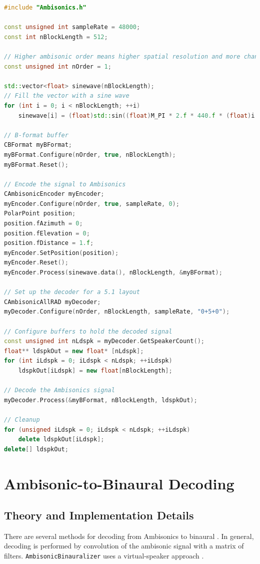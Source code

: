 \documentclass[12pt]{report}
\begin{document}
\begin{lstlisting}[language=C++]
#include "Ambisonics.h"

const unsigned int sampleRate = 48000;
const int nBlockLength = 512;

// Higher ambisonic order means higher spatial resolution and more channels required
const unsigned int nOrder = 1;

std::vector<float> sinewave(nBlockLength);
// Fill the vector with a sine wave
for (int i = 0; i < nBlockLength; ++i)
    sinewave[i] = (float)std::sin((float)M_PI * 2.f * 440.f * (float)i / (float)sampleRate);

// B-format buffer
CBFormat myBFormat;
myBFormat.Configure(nOrder, true, nBlockLength);
myBFormat.Reset();

// Encode the signal to Ambisonics
CAmbisonicEncoder myEncoder;
myEncoder.Configure(nOrder, true, sampleRate, 0);
PolarPoint position;
position.fAzimuth = 0;
position.fElevation = 0;
position.fDistance = 1.f;
myEncoder.SetPosition(position);
myEncoder.Reset();
myEncoder.Process(sinewave.data(), nBlockLength, &myBFormat);

// Set up the decoder for a 5.1 layout
CAmbisonicAllRAD myDecoder;
myDecoder.Configure(nOrder, nBlockLength, sampleRate, "0+5+0");

// Configure buffers to hold the decoded signal
const unsigned int nLdspk = myDecoder.GetSpeakerCount();
float** ldspkOut = new float* [nLdspk];
for (int iLdspk = 0; iLdspk < nLdspk; ++iLdspk)
    ldspkOut[iLdspk] = new float[nBlockLength];

// Decode the Ambisonics signal
myDecoder.Process(&myBFormat, nBlockLength, ldspkOut);

// Cleanup
for (unsigned iLdspk = 0; iLdspk < nLdspk; ++iLdspk)
    delete ldspkOut[iLdspk];
delete[] ldspkOut;
\end{lstlisting}


\section{Ambisonic-to-Binaural Decoding}\label{AmbiToBin}

\subsection{Theory and Implementation Details}
There are several methods for decoding from Ambisonics to binaural \cite{Noisternig2003,schorkhuber2018binaural,Zaunschirm2018}.
In general, decoding is performed by convolution of the ambisonic signal with a matrix of filters.
\texttt{AmbisonicBinauralizer} uses a virtual-speaker approach \cite{Noisternig2003}.
\end{document}
